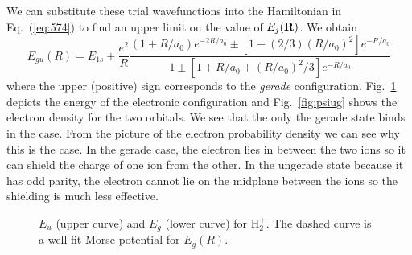 We can substitute these trial wavefunctions into the Hamiltonian in
Eq.~(\ref{eq:574}) to find an upper limit on the value of $E_j({\bf R})$.  We
obtain
\begin{equation}
E_{gu} (R) = E_{1s} + \frac{e^2}{R} \frac{(1 +
  R/a_0)e^{-2R/a_0}\pm[1-(2/3)(R/a_0)^2] e^{-R/a_0}}{1\pm[1+R/a_0+(R/a_0)^2/3]e^{-R/a_0}}
\label{eq:579}
\end{equation}
where the upper (positive) sign corresponds to the {\em gerade} configuration.
Fig.~\ref{fig:h2p} depicts the energy of the electronic configuration
and Fig.~\ref{fig:psiug} shows the electron density for the two
orbitals.  We see that the only the gerade state binds in the case.
From the picture of the electron probability density we can see why
this is the case.  In the gerade case, the electron lies in between
the two ions so it can shield the charge of one ion from the other.
In the ungerade state because it has odd parity, the electron cannot
lie on the midplane between the ions so the shielding is much less 
effective.  
{
\begin{figure}
\begin{center}
\end{center}
\caption{$E_{u}$ (upper curve) and $E_g$ (lower curve) for
  H$_2^+$. The dashed curve is a well-fit Morse potential for $E_g(R)$.}
\label{fig:h2p}
\end{figure}
}

